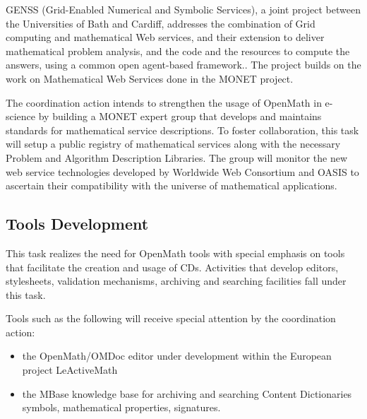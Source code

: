 \documentclass{euproposal}
\begin{document}
GENSS (Grid-Enabled Numerical and Symbolic Services), a joint project between the
Universities of Bath and Cardiff, addresses the combination of Grid computing and
mathematical Web services, and their extension to deliver mathematical problem
analysis, and the code and the resources to compute the answers, using a common
open agent-based framework.. The project builds on the work on Mathematical Web
Services done in the MONET project.

The coordination action intends to strengthen the usage of OpenMath in e-science
by building a MONET expert group that develops and maintains standards for
mathematical service descriptions. To foster collaboration, this task will setup a
public registry of mathematical services along with the necessary Problem and
Algorithm Description Libraries.  The group will monitor the new web service
technologies developed by Worldwide Web Consortium and OASIS to ascertain their
compatibility with the universe of mathematical applications.


\subsection{Tools Development}\label{tools}

This task realizes the need for OpenMath tools with special emphasis on tools that
facilitate the creation and usage of CDs. Activities that develop editors,
stylesheets, validation mechanisms, archiving and searching facilities fall under
this task.

Tools such as the following will receive special attention by the coordination
action:
\begin{itemize}
\item the OpenMath/OMDoc editor under development within the European project
  LeActiveMath
\item the MBase knowledge base for archiving and searching Content Dictionaries
  symbols, mathematical properties, signatures.
\end{itemize}
\end{document}
